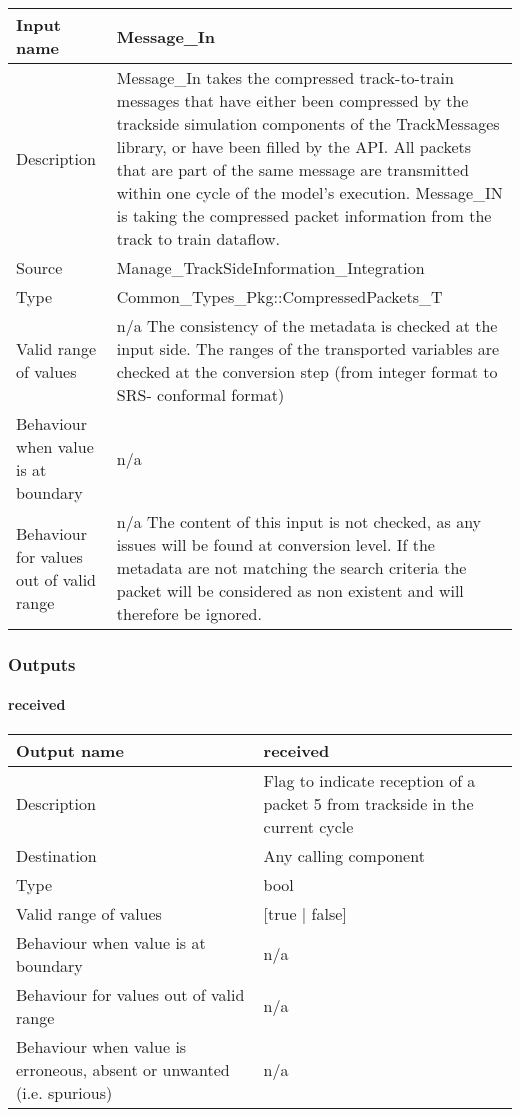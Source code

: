 \begin{longtable}{p{}p{}}
\toprule
Input name				&Message\_In \\
\midrule
Description				& Message\_In takes the compressed track-to-train messages that have either been compressed by the trackside simulation components of the TrackMessages library, or have been filled by the API. All packets that are part of the same message are transmitted within one cycle of the model's execution. Message\_IN is taking the compressed packet information from the track to train dataflow. \newline
  \\
\midrule
Source					& Manage\_TrackSideInformation\_Integration \\ 
\midrule
Type					& Common\_Types\_Pkg::CompressedPackets\_T \\
\midrule
Valid range of values 	& n/a\newline
The consistency of the metadata is checked at the input side.\newline
The ranges of the transported variables are checked at the conversion step (from integer format to SRS- conformal format)
 \\
\midrule
Behaviour when value is at boundary	& n/a \\
\midrule
Behaviour for values out of valid range	& n/a \newline \newline
The content of this input is not checked, as any issues will be found at conversion level. If the metadata are not matching the search criteria the packet will be considered as non existent and will therefore be ignored. 
 \\
\bottomrule
\end{longtable}




\subsubsection{Outputs}\label{s:trackside_outputs}

\paragraph{received}

\begin{longtable}{p{}p{}}
\toprule
Output name				& received \\
\midrule
Description				& Flag to indicate reception of a packet 5 from trackside in the current cycle \\
\midrule
Destination				& Any calling component\\ 
\midrule
Type					& bool \\
\midrule
Valid range of values	&
[true | false]
 \\
\midrule
Behaviour when value is at boundary	& n/a \\
\midrule
Behaviour for values out of valid range	& n/a \\
\midrule
Behaviour when value is erroneous, absent or unwanted (i.e. spurious) & n/a\\
\bottomrule
\end{longtable}


